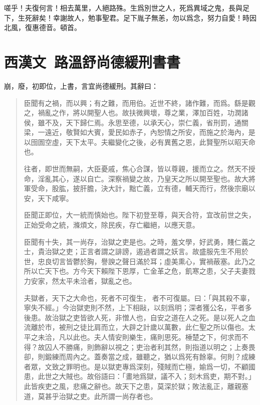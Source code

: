 嗟乎！夫復何言！相去萬里，人絕路殊。生爲別世之人，死爲異域之鬼，長與足下，生死辭矣！幸謝故人，勉事聖君。足下胤子無恙，勿以爲念，努力自愛！時因北風，復惠德音。頓首。 

\theendnotes

\section[路溫舒尚德緩刑書\quad{\small 西漢文}]{{\normalsize 西漢文\ 路溫舒}\quad 尚德緩刑書書}
崩，廢，初即位，上書，言宜尚德緩刑。其辭曰：

\begin{quotation}
臣聞有之禍，而以興；有之難，而用伯。近世不終，諸作難，而爲。繇是觀之，禍亂之作，將以開聖人也。故扶微興壞，尊之業，澤加百姓，功潤諸侯，雖不及，天下歸仁焉。永思至德，以承天心，崇仁義，省刑罰，通關梁，一遠近，敬賢如大賓，愛民如赤子，內恕情之所安，而施之於海內，是以囹圄空虛，天下太平。夫繼變化之後，必有異舊之恩，此賢聖所以昭天命也。

往者，即世而無嗣，大臣憂戚，焦心合謀，皆以尊親，援而立之。然天不授命，淫亂其心，遂以自亡。深察禍變之故，乃皇天之所以開至聖也。故大將軍受命，股肱，披肝膽，決大計，黜亡義，立有德，輔天而行，然後宗廟以安，天下咸寧。

臣聞正即位，大一統而慎始也。陛下初登至尊，與天合符，宜改前世之失，正始受命之統，滌煩文，除民疾，存亡繼絕，以應天意。

臣聞有十失，其一尚存，治獄之吏是也。之時，羞文學，好武勇，賤仁義之士，貴治獄之吏；正言者謂之誹謗，遏過者謂之妖言。故盛服先生不用於世，忠良切言皆鬱於胸，譽諛之聲日滿於耳；虛美熏心，實禍蔽塞。此乃之所以亡天下也。方今天下賴陛下恩厚，亡金革之危，飢寒之患，父子夫妻戮力安家，然太平未洽者，獄亂之也。

夫獄者，天下之大命也，死者不可復生，{\selectfont 𢇍}者不可復屬。曰：「與其殺不辜，寧失不經。」今治獄吏則不然，上下相敺，以刻爲明；深者獲公名，平者多後患。故治獄之吏皆欲人死，非憎人也，自安之道在人之死。是以死人之血流離於市，被刑之徒比肩而立，大辟之計歲以萬數，此仁聖之所以傷也。太平之未洽，凡以此也。夫人情安則樂生，痛則思死。棰楚之下，何求而不得？故囚人不勝痛，則飾辭以視之；吏治者利其然，則指道以明之；上奏畏卻，則鍛練而周內之。蓋奏當之成，雖聽之，猶以爲死有餘辜。何則？成練者眾，文致之罪明也。是以獄吏專爲深刻，殘賊而亡極，媮爲一切，不顧國患，此世之大賊也。故俗語曰：「畫地爲獄，議不入；刻木爲吏，期不對。」此皆疾吏之風，悲痛之辭也。故天下之患，莫深於獄；敗法亂正，離親塞道，莫甚乎治獄之吏。此所謂一尚存者也。


\end{quotation}
